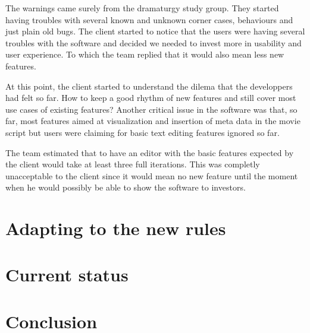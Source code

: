 \documentclass[lnbip]{svmultln}
\begin{document}
The warnings came surely from the dramaturgy study group. They started
having troubles with several known and unknown corner cases,
behaviours and just plain old bugs. The client started to notice that
the users were having several troubles with the software and decided
we needed to invest more in usability and user experience. To which
the team replied that it would also mean less new features.

At this point, the client started to understand the dilema that the
developpers had felt so far. How to keep a good rhythm of new features
and still cover most use cases of existing features? Another critical
issue in the software was that, so far, most features aimed at
visualization and insertion of meta data in the movie script but users
were claiming for basic text editing features ignored so far.

The team estimated that to have an editor with the basic features
expected by the client would take at least three full iterations. This
was completly unacceptable to the client since it would mean no new
feature until the moment when he would possibly be able to show the
software to investors.

\section{Adapting to the new rules}
\label{sec:adapting}

\section{Current status}
\label{sec:nowadays}

\section{Conclusion}
\label{sec:conclusion}
\end{document}
